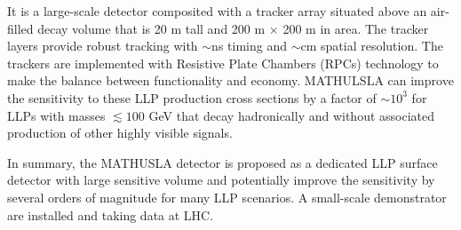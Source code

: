It is a large-scale detector composited with a tracker array situated above an air-filled decay volume that is 20 m tall and 200 m $\times$ 200 m in area. The tracker layers provide robust tracking with $\sim$ns timing and $\sim$cm spatial resolution. The trackers are implemented with Resistive Plate Chambers (RPCs) technology to make the balance between functionality and economy. MATHULSLA can improve the sensitivity to these LLP production
cross sections by a factor of $\sim 10^3$ for LLPs with masses $\lesssim 100$ GeV that decay hadronically and without associated production of other highly visible signals. 

In summary, the MATHUSLA detector is proposed as a dedicated LLP surface detector with large sensitive volume and potentially improve the sensitivity by several orders of magnitude for many LLP scenarios. A small-scale demonstrator are installed and taking data at LHC.
